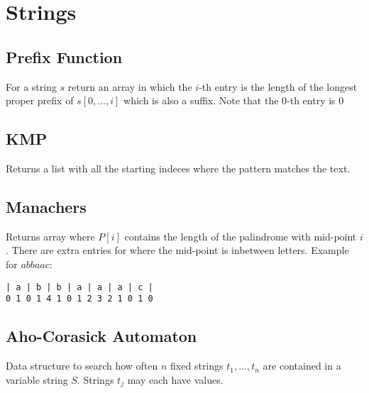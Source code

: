 \section{Strings}

\subsection{Prefix Function}
For a string $s$ return an array in which the $i$-th entry is the
length of the longest proper prefix of $s[0,\ldots, i]$ which is also
a suffix.  Note that the $0$-th entry is $0$


\subsection{KMP}
Returns a list with all the starting indeces where the pattern matches
the text.


\subsection{Manachers}
Returns array where $P[i]$ contains the length of the palindrome with
mid-point $i$. There are extra entries for where the mid-point is
inbetween letters. Example for $abbaac$:
\begin{verbatim}
| a | b | b | a | a | a | c |
0 1 0 1 4 1 0 1 2 3 2 1 0 1 0
\end{verbatim}

\subsection{Aho-Corasick Automaton}
Data structure to search how often $n$ fixed strings $t_1, \dots, t_n$
are contained in a variable string $S$. Strings $t_j$ may each have
values.


